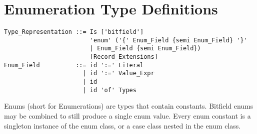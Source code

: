 






\section{Enumeration Type Definitions}
\label{sec:enums}

\syntax\begin{lstlisting}
Type_Representation ::= Is ['bitfield'] 
                        'enum' ('{' Enum_Field {semi Enum_Field} '}'
                        | Enum_Field {semi Enum_Field})
                        [Record_Extensions]
Enum_Field          ::= id ':=' Literal
                      | id ':=' Value_Expr
                      | id
                      | id 'of' Types
\end{lstlisting}

Enums (short for Enumerations) are types that contain constants. Bitfield enums may be combined to still produce a single enum value. Every enum constant is a singleton instance of the enum class, or a case class nested in the enum class. 

